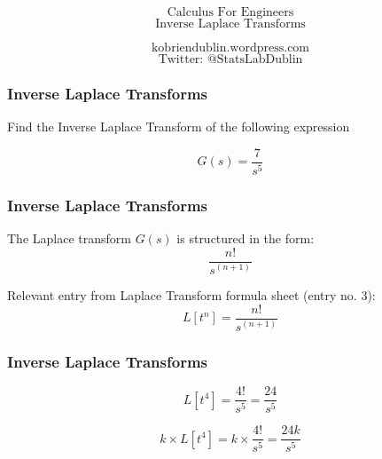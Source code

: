 \documentclass{beamer}
\begin{document}
\begin{frame}
\Huge
\[\mbox{Calculus For Engineers}\]
\LARGE
\[\mbox{Inverse Laplace Transforms}\]

\Large
\[\mbox{kobriendublin.wordpress.com}\]
\[\mbox{Twitter: @StatsLabDublin}\]
\end{frame}

\begin{frame}
\frametitle{Inverse Laplace Transforms }
\LARGE

Find the Inverse Laplace Transform of the following expression

\[ G(s) = \frac{7}{s^5} \]

\end{frame}

\begin{frame}
\frametitle{Inverse Laplace Transforms}
\Large
The Laplace transform $G(s)$ is structured in the form:
\[ \frac{n!}{s^{(n+1)}} \]

Relevant entry from Laplace Transform formula sheet (entry no. 3):
\[ L[t^n] = \frac{n!}{s^{(n+1)}}  \]

\phantom{Clearly n = 4}
\bigskip
\end{frame}

\begin{frame}
\frametitle{Inverse Laplace Transforms}
\LARGE
\vspace{-1.9cm}
\[ L[t^4] = \frac{4!}{s^5} =\frac{24}{s^5} \]

\[ k\times L[t^4] = k \times \frac{4!}{s^5} =\frac{24k}{s^5} \]

\bigskip

\end{frame}
\end{document}
